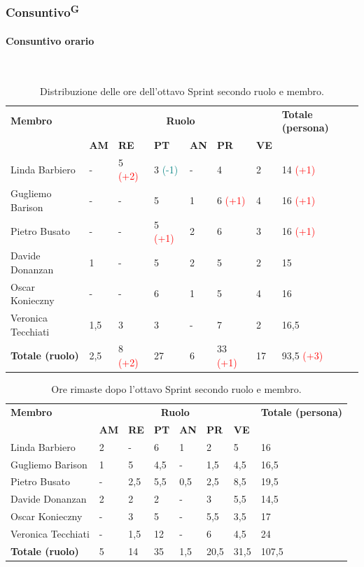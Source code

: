 \documentclass[8pt]{article}
\newcommand{\glossterm}[1]{#1\textsuperscript{G}} %
\newcommand{\subsubsubsection}[1]{\paragraph{#1}\mbox{}\\}
\begin{document}
\subsubsection{\glossterm{Consuntivo}}
\subsubsubsection{Consuntivo orario}
\begin{table}[ht!]
	\centering
	\begin{tabular}{p{4cm} *{6}{l} p{3cm}}
		\toprule
        \textbf{Membro} & \multicolumn{6}{c}{\textbf{Ruolo}} & \textbf{Totale (persona)}\\
		& \textbf{AM} & \textbf{RE} & \textbf{PT} & \textbf{AN} & \textbf{PR} & \textbf{VE}\\
		\midrule
        Linda Barbiero & - & 5 \textcolor{red}{(+2)} & 3 \textcolor{teal}{(-1)} & - & 4 & 2 & 14 \textcolor{red}{(+1)} \\ 
        Gugliemo Barison & - & - & 5 & 1 & 6 \textcolor{red}{(+1)} & 4 & 16 \textcolor{red}{(+1)} \\ 
        Pietro Busato & - & - & 5 \textcolor{red}{(+1)} & 2 & 6 & 3 & 16 \textcolor{red}{(+1)} \\ 
        Davide Donanzan & 1 & - & 5 & 2 & 5 & 2 & 15 \\ 
        Oscar Konieczny & - & - & 6 & 1 & 5 & 4 & 16 \\ 
        Veronica Tecchiati & 1,5 & 3 & 3 & - & 7 & 2 & 16,5 \\ 
        \midrule
        \textbf{Totale (ruolo)} & 2,5 & 8 \textcolor{red}{(+2)} & 27 & 6 & 33 \textcolor{red}{(+1)} & 17 & 93,5 \textcolor{red}{(+3)} \\ 
		\bottomrule
	\end{tabular}
	\caption{Distribuzione delle ore dell'ottavo Sprint secondo ruolo e membro.}
	\label{table:Distribuzione delle ore dell'ottavo Sprint secondo ruolo e membro}
\end{table}
\begin{table}[ht!]
	\centering
	\begin{tabular}{p{4cm} p{1cm} p{1cm} p{1cm} p{1cm} p{1cm} p{1cm} p{3cm}}
		\toprule
        \textbf{Membro} & \multicolumn{6}{c}{\textbf{Ruolo}} & \textbf{Totale (persona)}\\
		& \textbf{AM} & \textbf{RE} & \textbf{PT} & \textbf{AN} & \textbf{PR} & \textbf{VE}\\
		\midrule
        Linda Barbiero & 2 & - & 6 & 1 & 2 & 5 & 16 \\ 
        Gugliemo Barison & 1 & 5 & 4,5 & - & 1,5 & 4,5 & 16,5 \\ 
        Pietro Busato & - & 2,5 & 5,5 & 0,5 & 2,5 & 8,5 & 19,5 \\ 
        Davide Donanzan & 2 & 2 & 2 & - & 3 & 5,5 & 14,5 \\ 
        Oscar Konieczny & - & 3 & 5 & - & 5,5 & 3,5 & 17 \\ 
        Veronica Tecchiati & - & 1,5 & 12 & - & 6 & 4,5 & 24 \\
        \midrule
        \textbf{Totale (ruolo)} & 5 & 14 & 35 & 1,5 & 20,5 & 31,5 & 107,5 \\ 
		\bottomrule
	\end{tabular}
	\caption{Ore rimaste dopo l'ottavo Sprint secondo ruolo e membro.}
	\label{table:Ore rimaste dopo l'ottavo Sprint secondo ruolo e membro}
\end{table}
\end{document}
